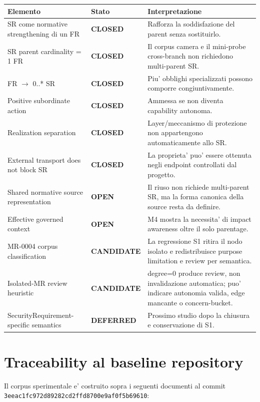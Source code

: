 \documentclass[11pt,a4paper]{article}
\newcommand{\closed}{\textbf{CLOSED}}
\newcommand{\candidate}{\textbf{CANDIDATE}}
\newcommand{\openstatus}{\textbf{OPEN}}
\newcommand{\deferred}{\textbf{DEFERRED}}
\begin{document}
\footnotesize
\begin{longtable}{p{}p{}p{}}
\toprule
\textbf{Elemento} & \textbf{Stato} & \textbf{Interpretazione} \\
\midrule
\endhead
SR come normative strengthening di un FR & \closed{} & Rafforza la soddisfazione del parent senza sostituirlo. \\
SR parent cardinality = 1 FR & \closed{} & Il corpus camera e il mini-probe cross-branch non richiedono multi-parent SR. \\
FR $\rightarrow$ 0..* SR & \closed{} & Piu' obblighi specializzati possono comporre congiuntivamente. \\
Positive subordinate action & \closed{} & Ammessa se non diventa capability autonoma. \\
Realization separation & \closed{} & Layer/meccanismo di protezione non appartengono automaticamente allo SR. \\
External transport does not block SR & \closed{} & La proprieta' puo' essere ottenuta negli endpoint controllati dal progetto. \\
Shared normative source representation & \openstatus{} & Il riuso non richiede multi-parent SR, ma la forma canonica della source resta da definire. \\
Effective governed context & \openstatus{} & M4 mostra la necessita' di impact awareness oltre il solo parentage. \\
MR-0004 corpus classification & \candidate{} & La regressione S1 ritira il nodo isolato e redistribuisce purpose limitation e review per semantica. \\
Isolated-MR review heuristic & \candidate{} & degree=0 produce review, non invalidazione automatica; puo' indicare autonomia valida, edge mancante o concern-bucket. \\
SecurityRequirement-specific semantics & \deferred{} & Prossimo studio dopo la chiusura e conservazione di S1. \\
\bottomrule
\end{longtable}
\normalsize

\section{Traceability al baseline repository}

Il corpus sperimentale e' costruito sopra i seguenti documenti al commit \nolinkurl{3eeac1fc972d89282cd2ffd8700e9af0f5b69610}:
\end{document}

